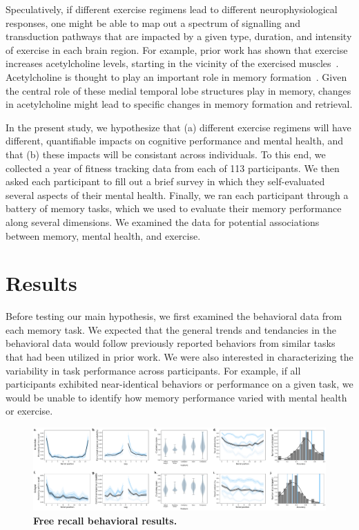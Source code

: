 \documentclass[10pt]{article}
\begin{document}
Speculatively, if different exercise regimens lead to different
neurophysiological responses, one might be able to map out a spectrum
of signalling and transduction pathways that are impacted by a given
type, duration, and intensity of exercise in each brain region.  For
example, prior work has shown that exercise increases acetylcholine
levels, starting in the vicinity of the exercised
muscles~\citep{ShoeEtal97}.  Acetylcholine is thought to play an
important role in memory formation~\citep[e.g., by modulating specific
synaptic inputs from entorhinal cortex to the hippocampus, albeit in
rodents;]{PalaEtal21}.  Given the central role of these medial
temporal lobe structures play in memory, changes in acetylcholine
might lead to specific changes in memory formation and retrieval.

In the present study, we hypothesize that (a) different exercise regimens will
have different, quantifiable impacts on cognitive performance and
mental health, and that (b) these impacts will be consistant across
individuals.  To this end, we collected a year of fitness tracking
data from each of 113 participants.  We then asked each participant to
fill out a brief survey in which they self-evaluated several aspects
of their mental health.  Finally, we ran each participant through a
battery of memory tasks, which we used to evaluate their memory
performance along several dimensions.  We examined the data for
potential associations between memory, mental health, and exercise.

\section*{Results}
Before testing our main hypothesis, we first examined the behavioral
data from each memory task.  We expected that the general trends and
tendancies in the behavioral data would follow previously reported
behaviors from similar tasks that had been utilized in prior work.  We
were also interested in characterizing the variability in task
performance across participants.  For example, if all participants
exhibited near-identical behaviors or performance on a given task, we
would be unable to identify how memory performance varied with
mental health or exercise.

\begin{figure}[tp]
\centering
\includegraphics[width=1\textwidth]{figs/free_recall_behavior}
\caption{\textbf{Free recall behavioral results.}}
\label{fig:fr_behavioral}
\end{figure}
\end{document}
